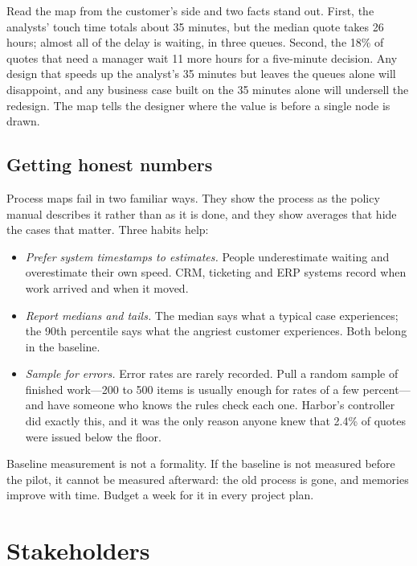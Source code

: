 Read the map from the customer's side and two facts stand out. First, the analysts' touch time totals about 35 minutes, but the median quote takes 26 hours; almost all of the delay is waiting, in three queues. Second, the 18\% of quotes that need a manager wait 11 more hours for a five-minute decision. Any design that speeds up the analyst's 35 minutes but leaves the queues alone will disappoint, and any business case built on the 35 minutes alone will undersell the redesign. The map tells the designer where the value is before a single node is drawn.

\subsection{Getting honest numbers}

Process maps fail in two familiar ways. They show the process as the policy manual describes it rather than as it is done, and they show averages that hide the cases that matter. Three habits help:
\begin{itemize}[itemsep=1pt]
  \item \emph{Prefer system timestamps to estimates.} People underestimate waiting and overestimate their own speed. CRM, ticketing and ERP systems record when work arrived and when it moved.
  \item \emph{Report medians and tails.} The median says what a typical case experiences; the 90th percentile says what the angriest customer experiences. Both belong in the baseline.
  \item \emph{Sample for errors.} Error rates are rarely recorded. Pull a random sample of finished work---200 to 500 items is usually enough for rates of a few percent---and have someone who knows the rules check each one. Harbor's controller did exactly this, and it was the only reason anyone knew that 2.4\% of quotes were issued below the floor.
\end{itemize}

\begin{designnote}
Baseline measurement is not a formality. If the baseline is not measured before the pilot, it cannot be measured afterward: the old process is gone, and memories improve with time. Budget a week for it in every project plan.
\end{designnote}

\section{Stakeholders}
\label{sec:stakeholders}

